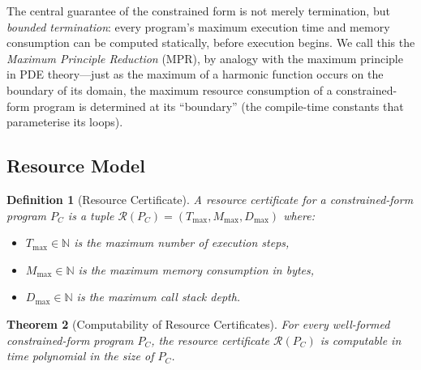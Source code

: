 \documentclass[11pt,a4paper]{article}
\newtheorem{theorem}{Theorem}[section]
\newtheorem{definition}[theorem]{Definition}
\begin{document}
The central guarantee of the constrained form is not merely termination, but
\emph{bounded termination}: every program's maximum execution time and memory
consumption can be computed statically, before execution begins.  We call this
the \emph{Maximum Principle Reduction} (MPR), by analogy with the maximum
principle in PDE theory---just as the maximum of a harmonic function occurs on
the boundary of its domain, the maximum resource consumption of a
constrained-form program is determined at its ``boundary'' (the compile-time
constants that parameterise its loops).

\subsection{Resource Model}

\begin{definition}[Resource Certificate]
A \emph{resource certificate} for a constrained-form program $P_C$ is a tuple
$\mathcal{R}(P_C) = (T_{\max}, M_{\max}, D_{\max})$ where:
\begin{itemize}[nosep]
  \item $T_{\max} \in \mathbb{N}$ is the maximum number of execution steps,
  \item $M_{\max} \in \mathbb{N}$ is the maximum memory consumption in bytes,
  \item $D_{\max} \in \mathbb{N}$ is the maximum call stack depth.
\end{itemize}
\end{definition}

\begin{theorem}[Computability of Resource Certificates]
\label{thm:mpr}
For every well-formed constrained-form program $P_C$, the resource certificate
$\mathcal{R}(P_C)$ is computable in time polynomial in the size of $P_C$.
\end{theorem}
\end{document}
